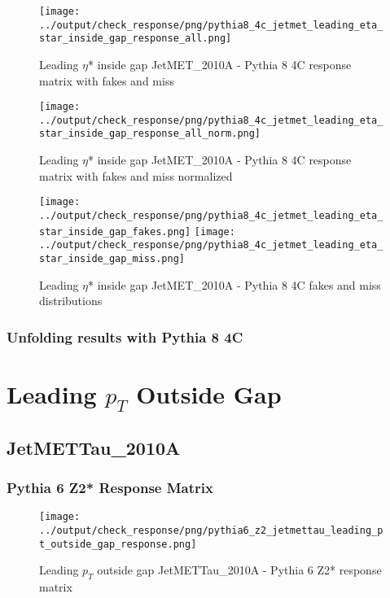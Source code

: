 \documentclass[11pt]{book}
\begin{document}
\begin{figure}[ht]
\centering
\texttt{[image: ../output/check\_response/png/pythia8\_4c\_jetmet\_leading\_eta\_star\_inside\_gap\_response\_all.png]}
\caption{Leading $\eta$* inside gap JetMET\_2010A - Pythia 8 4C response matrix with fakes and miss}
\label{p8_jetmet_leading_eta_star_inside_gap_response_all}
\end{figure}

\begin{figure}[ht]
\centering
\texttt{[image: ../output/check\_response/png/pythia8\_4c\_jetmet\_leading\_eta\_star\_inside\_gap\_response\_all\_norm.png]}
\caption{Leading $\eta$* inside gap JetMET\_2010A - Pythia 8 4C response matrix with fakes and miss normalized}
\label{p8_jetmet_leading_eta_star_inside_gap_response_all_norm}
\end{figure}

\begin{figure}[ht]
\centering
\texttt{[image: ../output/check\_response/png/pythia8\_4c\_jetmet\_leading\_eta\_star\_inside\_gap\_fakes.png]}
\texttt{[image: ../output/check\_response/png/pythia8\_4c\_jetmet\_leading\_eta\_star\_inside\_gap\_miss.png]}
\caption{Leading $\eta$* inside gap JetMET\_2010A - Pythia 8 4C fakes and miss distributions}
\label{p8_jetmet_leading_eta_star_inside_gap_fakesmiss}
\end{figure}


\clearpage
\subsection{Unfolding results with Pythia 8 4C}



\newpage
\chapter{Leading $p_{T}$ Outside Gap}
\section{JetMETTau\_2010A}
\subsection{Pythia 6 Z2* Response Matrix}

\begin{figure}[ht]
\centering
\texttt{[image: ../output/check\_response/png/pythia6\_z2\_jetmettau\_leading\_pt\_outside\_gap\_response.png]}
\caption{Leading $p_{T}$ outside gap JetMETTau\_2010A - Pythia 6 Z2* response matrix}
\label{p6_jetmettau_leading_pt_outside_gap_response}
\end{figure}
\end{document}
